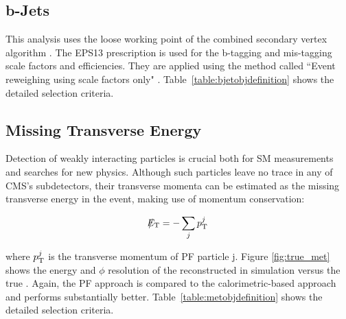 \subsection{b-Jets} 
\label{subsec::objsel_bjet}


This analysis uses the loose working point of the combined secondary vertex algorithm \cite{CMS:2011cra}. The EPS13 prescription is used for the b-tagging and mis-tagging scale factors and efficiencies. They are applied using the method called ``Event reweighing using scale factors only" \cite{Ferencek:btag2015}. Table~\ref{table:bjetobjdefinition} shows the detailed selection criteria.

\subsection{Missing Transverse Energy}
\label{subsec::objsel_met}

Detection of weakly interacting particles is crucial both for SM measurements and searches for new physics. Although such particles leave no trace in any of CMS’s subdetectors, their transverse momenta can be estimated as the missing transverse energy in the event, making use of momentum conservation:

\begin{equation}
\slash\mkern-12mu{E}_{\text{T}} =  - \sum_{j} p_{\text{T}}^{j}
\end{equation}
 
where \ensuremath{\pt^{j}} is the transverse momentum of PF particle j. Figure \ref{fig:true_met} shows the energy and \ensuremath{\phi} resolution of the reconstructed \met in simulation versus the true \met. Again, the PF approach is compared to the calorimetric-based approach and performs substantially better. Table~\ref{table:metobjdefinition} shows the detailed selection criteria.


